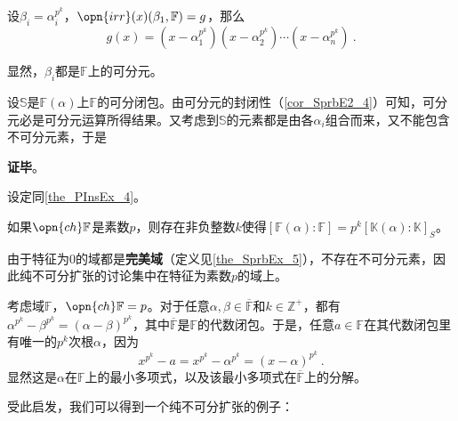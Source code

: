 设$\beta_i=\alpha_i^{p^k}$，$\opn{irr}(x)(\beta_1, \mathbb{F})=g$，那么
\begin{equation}
g(x) = (x-\alpha^{p^k}_1)(x-\alpha^{p^k}_2)\cdots(x-\alpha^{p^k}_n)~.
\end{equation}

显然，$\beta_i$都是$\mathbb{F}$上的可分元。

设$\mathbb{S}$是$\mathbb{F}(\alpha)$上$\mathbb{F}$的可分闭包。由可分元的封闭性（\autoref{cor_SprbE2_4}）可知，可分元必是可分元运算所得结果。又考虑到$\mathbb{S}$的元素都是由各$\alpha_i$组合而来，又不能包含不可分元素，于是

\textbf{证毕}。





\begin{corollary}{}
设定同\autoref{the_PInsEx_4}。

如果$\opn{ch}\mathbb{F}$是素数$p$，则存在非负整数$k$使得$[\mathbb{F}(\alpha):\mathbb{F}]=p^k[\mathbb{K}(\alpha):\mathbb{K}]_S$。
\end{corollary}



由于特征为$0$的域都是\textbf{完美域}（定义见\autoref{the_SprbEx_5}），不存在不可分元素，因此纯不可分扩张的讨论集中在特征为素数$p$的域上。

考虑域$\mathbb{F}$，$\opn{ch}\mathbb{F}=p$。对于任意$\alpha, \beta\in\overline{\mathbb{F}}$和$k\in\mathbb{Z}^+$，都有$\alpha^{p^k}-\beta^{p^k}=(\alpha-\beta)^{p^k}$，其中$\overline{\mathbb{F}}$是$\mathbb{F}$的代数闭包。于是，任意$a\in\mathbb{F}$在其代数闭包里有唯一的$p^k$次根$\alpha$，因为
\begin{equation}
x^{p^k}-a=x^{p^k}-\alpha^{p^k}=(x-\alpha)^{p^k}~.
\end{equation}
显然这是$\alpha$在$\mathbb{F}$上的最小多项式，以及该最小多项式在$\overline{\mathbb{F}}$上的分解。


受此启发，我们可以得到一个纯不可分扩张的例子：

